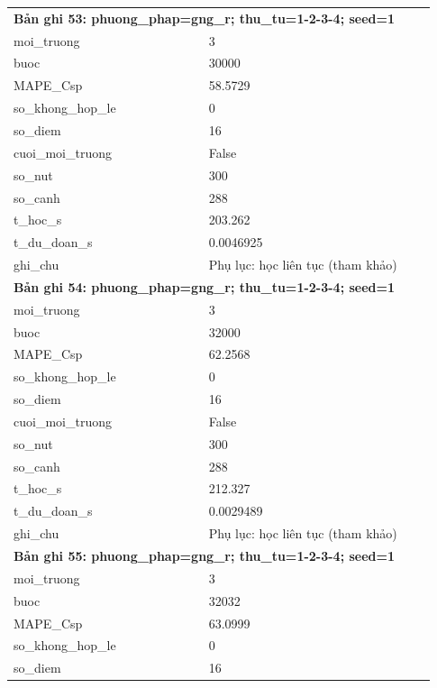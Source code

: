 \begin{longtable}{p{0.43\linewidth}p{0.50\linewidth}}
\midrule
\multicolumn{2}{p{0.95\linewidth}}{\textbf{Bản ghi 53: phuong\_phap=gng\_r; thu\_tu=1-2-3-4; seed=1}} \\
moi\_\allowbreak truong & 3 \\
buoc & 30000 \\
MAPE\_\allowbreak Csp & 58.5729 \\
so\_\allowbreak khong\_\allowbreak hop\_\allowbreak le & 0 \\
so\_\allowbreak diem & 16 \\
cuoi\_\allowbreak moi\_\allowbreak truong & False \\
so\_\allowbreak nut & 300 \\
so\_\allowbreak canh & 288 \\
t\_\allowbreak hoc\_\allowbreak s & 203.262 \\
t\_\allowbreak du\_\allowbreak doan\_\allowbreak s & 0.0046925 \\
ghi\_\allowbreak chu & Phụ lục: học liên tục (tham khảo) \\
\midrule
\multicolumn{2}{p{0.95\linewidth}}{\textbf{Bản ghi 54: phuong\_phap=gng\_r; thu\_tu=1-2-3-4; seed=1}} \\
moi\_\allowbreak truong & 3 \\
buoc & 32000 \\
MAPE\_\allowbreak Csp & 62.2568 \\
so\_\allowbreak khong\_\allowbreak hop\_\allowbreak le & 0 \\
so\_\allowbreak diem & 16 \\
cuoi\_\allowbreak moi\_\allowbreak truong & False \\
so\_\allowbreak nut & 300 \\
so\_\allowbreak canh & 288 \\
t\_\allowbreak hoc\_\allowbreak s & 212.327 \\
t\_\allowbreak du\_\allowbreak doan\_\allowbreak s & 0.0029489 \\
ghi\_\allowbreak chu & Phụ lục: học liên tục (tham khảo) \\
\midrule
\multicolumn{2}{p{0.95\linewidth}}{\textbf{Bản ghi 55: phuong\_phap=gng\_r; thu\_tu=1-2-3-4; seed=1}} \\
moi\_\allowbreak truong & 3 \\
buoc & 32032 \\
MAPE\_\allowbreak Csp & 63.0999 \\
so\_\allowbreak khong\_\allowbreak hop\_\allowbreak le & 0 \\
so\_\allowbreak diem & 16 \\

\end{longtable}

